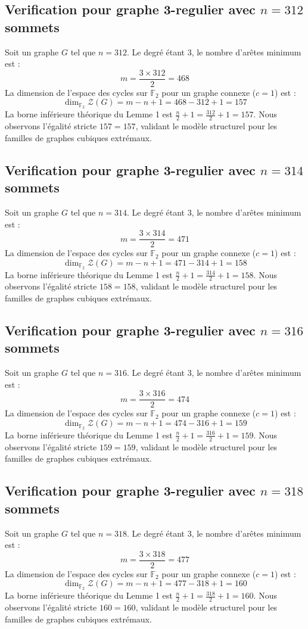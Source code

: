 \documentclass[11pt,a4paper]{article}
\begin{document}
\subsection{Verification pour graphe 3-regulier avec $n=312$ sommets}
Soit un graphe $G$ tel que $n = 312$. Le degré étant 3, le nombre d'arêtes minimum est :
$$ m = \frac{3 \times 312}{2} = 468 $$
La dimension de l'espace des cycles sur $\mathbb{F}_2$ pour un graphe connexe ($c=1$) est :
$$ \dim_{\mathbb{F}_2} \mathcal{Z}(G) = m - n + 1 = 468 - 312 + 1 = 157 $$
La borne inférieure théorique du Lemme 1 est $\frac{n}{2} + 1 = \frac{312}{2} + 1 = 157$.
Nous observons l'égalité stricte $157 = 157$, validant le modèle structurel pour les familles de graphes cubiques extrémaux.

\subsection{Verification pour graphe 3-regulier avec $n=314$ sommets}
Soit un graphe $G$ tel que $n = 314$. Le degré étant 3, le nombre d'arêtes minimum est :
$$ m = \frac{3 \times 314}{2} = 471 $$
La dimension de l'espace des cycles sur $\mathbb{F}_2$ pour un graphe connexe ($c=1$) est :
$$ \dim_{\mathbb{F}_2} \mathcal{Z}(G) = m - n + 1 = 471 - 314 + 1 = 158 $$
La borne inférieure théorique du Lemme 1 est $\frac{n}{2} + 1 = \frac{314}{2} + 1 = 158$.
Nous observons l'égalité stricte $158 = 158$, validant le modèle structurel pour les familles de graphes cubiques extrémaux.

\subsection{Verification pour graphe 3-regulier avec $n=316$ sommets}
Soit un graphe $G$ tel que $n = 316$. Le degré étant 3, le nombre d'arêtes minimum est :
$$ m = \frac{3 \times 316}{2} = 474 $$
La dimension de l'espace des cycles sur $\mathbb{F}_2$ pour un graphe connexe ($c=1$) est :
$$ \dim_{\mathbb{F}_2} \mathcal{Z}(G) = m - n + 1 = 474 - 316 + 1 = 159 $$
La borne inférieure théorique du Lemme 1 est $\frac{n}{2} + 1 = \frac{316}{2} + 1 = 159$.
Nous observons l'égalité stricte $159 = 159$, validant le modèle structurel pour les familles de graphes cubiques extrémaux.

\subsection{Verification pour graphe 3-regulier avec $n=318$ sommets}
Soit un graphe $G$ tel que $n = 318$. Le degré étant 3, le nombre d'arêtes minimum est :
$$ m = \frac{3 \times 318}{2} = 477 $$
La dimension de l'espace des cycles sur $\mathbb{F}_2$ pour un graphe connexe ($c=1$) est :
$$ \dim_{\mathbb{F}_2} \mathcal{Z}(G) = m - n + 1 = 477 - 318 + 1 = 160 $$
La borne inférieure théorique du Lemme 1 est $\frac{n}{2} + 1 = \frac{318}{2} + 1 = 160$.
Nous observons l'égalité stricte $160 = 160$, validant le modèle structurel pour les familles de graphes cubiques extrémaux.
\end{document}
